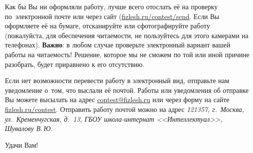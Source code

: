 \documentclass[a4paper,12pt]{article}
\begin{document}
Как бы Вы ни оформляли работу, лучше всего отослать её на проверку по~электронной
почте или через сайт (\href{http://fizlesh.ru/contest/send}{fizlesh.ru/contest/send}.
Если Вы оформляете её на бумаге, отсканируйте или сфотографируйте работу
(пожалуйста, для обеспечения читаемости, не пользуйтесь для этого камерами на телефонах).
\textbf{Важно}: в любом случае проверьте электронный вариант вашей работы на читаемость!
Решение, которое мы не сможем по той или иной причине разобрать, будет приравнено к его отсутствию.

Если нет возможности перевести работу в электронный вид, отправьте нам уведомление
о~том, что выслали её почтой. Работы или уведомления об отправке Вы можете высылать
на адрес \href{mailto:contest@fizlesh.ru}{contest@fizlesh.ru}
или через форму на сайте \href{http://fizlesh.ru/contest}{fizlesh.ru/contest}.
Отправить работу почтой можно на адрес \emph{121357, г.~Москва, ул.~Кременчугская, д.~13, ГБОУ школа-интернат
<<Интеллектуал>>, Шувалову В.\,Ю.}

\vfill

Удачи Вам!
\end{document}
